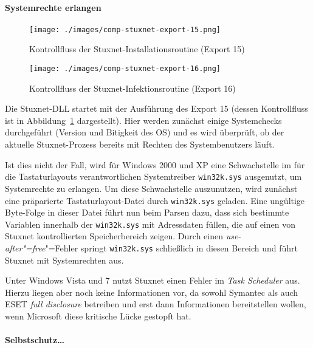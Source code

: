 \paragraph{Systemrechte erlangen}

\begin{figure}[p]
  \centering
  \texttt{[image: ./images/comp-stuxnet-export-15.png]}
  \caption{Kontrollfluss der Stuxnet-Installationsroutine (Export 15)}
  \label{fig:comp:stuxnet:export15}
\end{figure}

\begin{figure}[p]
  \centering
  \texttt{[image: ./images/comp-stuxnet-export-16.png]}
  \caption{Kontrollfluss der Stuxnet-Infektionsroutine (Export 16)}
  \label{fig:comp:stuxnet:export16}
\end{figure}

Die Stuxnet-DLL startet mit der Ausführung des Export 15 (dessen
Kontrollfluss ist in Abbildung~\ref{fig:comp:stuxnet:export15}
dargestellt). Hier werden zunächst einige Systemchecks durchgeführt
(Version und Bitigkeit des OS) und es wird überprüft, ob der aktuelle
Stuxnet-Prozess bereits mit Rechten des Systembenutzers läuft.

Ist dies nicht der Fall, wird für Windows 2000 und XP eine
Schwachstelle im für die Tastaturlayouts verantwortlichen
Systemtreiber \texttt{win32k.sys} ausgenutzt, um Systemrechte zu
erlangen. Um diese Schwachstelle auszunutzen, wird zunächst eine
präparierte Tastaturlayout-Datei durch \texttt{win32k.sys}
geladen. Eine ungültige Byte-Folge in dieser Datei führt nun beim
Parsen dazu, dass sich bestimmte Variablen innerhalb der
\texttt{win32k.sys} mit Adressdaten füllen, die auf einen von Stuxnet
kontrollierten Speicherbereich zeigen. Durch einen
\textit{use-after"=free}"=Fehler springt \texttt{win32k.sys}
schließlich in diesen Bereich und führt Stuxnet mit Systemrechten aus.

Unter Windows Vista und 7 nutzt Stuxnet einen Fehler im \textit{Task
Scheduler} aus. Hierzu liegen aber noch keine Informationen vor, da
sowohl Symantec als auch ESET \textit{full disclosure} betreiben und
erst dann Informationen bereitstellen wollen, wenn Microsoft diese
kritische Lücke gestopft hat.

\paragraph{Selbstschutz\dots}
\label{sec:comp:stuxnet:protection}

